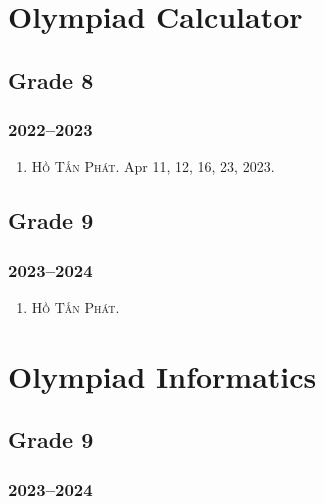 \documentclass{article}
\begin{document}

\section{Olympiad Calculator}

\subsection{Grade 8}

\subsubsection{2022--2023}

\begin{enumerate}
	\item \textsc{Hồ Tấn Phát.} {\sf[In]} Apr 11, 12, 16, 23, 2023.
\end{enumerate}


\subsection{Grade 9}

\subsubsection{2023--2024}

\begin{enumerate}
	\item \textsc{Hồ Tấn Phát.}
\end{enumerate}


\section{Olympiad Informatics}

\subsection{Grade 9}

\subsubsection{2023--2024}
\end{document}
